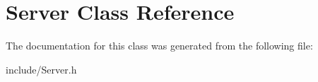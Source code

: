 \hypertarget{classServer}{}\section{Server Class Reference}
\label{classServer}


The documentation for this class was generated from the following file\+:\begin{DoxyCompactItemize}
\item 
include/Server.\+h\end{DoxyCompactItemize}

